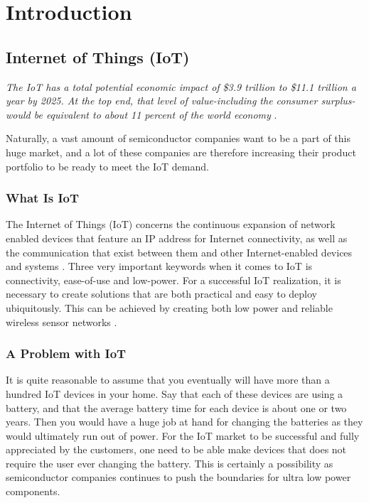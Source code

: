 \chapter{Introduction}

\section{Internet of Things (IoT)}

\textit{The IoT has a total potential economic impact of \$3.9 trillion to \$11.1 trillion a year by 2025. At the top end, that level of value-including the consumer surplus-would be equivalent to about 11 percent of the world economy} \cite{mckinsey15}.

Naturally, a vast amount of semiconductor companies want to be a part of this huge market, and a lot of these companies are therefore increasing their product portfolio to be ready to meet the IoT demand. 

\subsection{What Is IoT}

The Internet of Things (IoT) concerns the continuous expansion of network enabled devices that feature an IP address for Internet connectivity, as well as the communication that exist between them and other Internet-enabled devices and systems \cite{webopedia}. Three very important keywords when it comes to IoT is connectivity, ease-of-use and low-power. For a successful IoT realization, it is necessary to create solutions that are both practical and easy to deploy ubiquitously. This can be achieved by creating both low power and reliable wireless sensor networks \cite{embedded_IoT}. 

\subsection{A Problem with IoT}

It is quite reasonable to assume that you eventually will have more than a hundred IoT devices in your home. Say that each of these devices are using a battery, and that the average battery time for each device is about one or two years. Then you would have a huge job at hand for changing the batteries as they would ultimately run out of power. For the IoT market to be successful and fully appreciated by the customers, one need to be able make devices that does not require the user ever changing the battery. This is certainly a possibility as semiconductor companies continues to push the boundaries for ultra low power components.  

